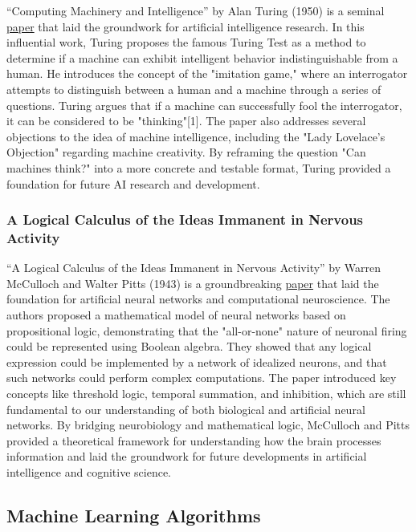 \documentclass{article}
\begin{document}
``Computing Machinery and Intelligence'' by Alan Turing (1950) is a seminal \href{https://www.cs.ox.ac.uk/activities/ieg/e-library/sources/t_article.pdf}{paper} that laid the groundwork for artificial intelligence research.\cite{Turing1950} In this influential work, Turing proposes the famous Turing Test as a method to determine if a machine can exhibit intelligent behavior indistinguishable from a human. He introduces the concept of the "imitation game," where an interrogator attempts to distinguish between a human and a machine through a series of questions. Turing argues that if a machine can successfully fool the interrogator, it can be considered to be "thinking"[1]. The paper also addresses several objections to the idea of machine intelligence, including the "Lady Lovelace's Objection" regarding machine creativity. By reframing the question "Can machines think?" into a more concrete and testable format, Turing provided a foundation for future AI research and development.

\subsubsection*{A Logical Calculus of the Ideas Immanent in Nervous Activity}

``A Logical Calculus of the Ideas Immanent in Nervous Activity'' by Warren McCulloch and Walter Pitts (1943) is a groundbreaking \href{https://link.springer.com/article/10.1007/BF02478259}{paper} that laid the foundation for artificial neural networks and computational neuroscience.\cite{Mcculloch1943} The authors proposed a mathematical model of neural networks based on propositional logic, demonstrating that the "all-or-none" nature of neuronal firing could be represented using Boolean algebra. They showed that any logical expression could be implemented by a network of idealized neurons, and that such networks could perform complex computations. The paper introduced key concepts like threshold logic, temporal summation, and inhibition, which are still fundamental to our understanding of both biological and artificial neural networks. By bridging neurobiology and mathematical logic, McCulloch and Pitts provided a theoretical framework for understanding how the brain processes information and laid the groundwork for future developments in artificial intelligence and cognitive science.

\subsection{Machine Learning Algorithms}
\end{document}

